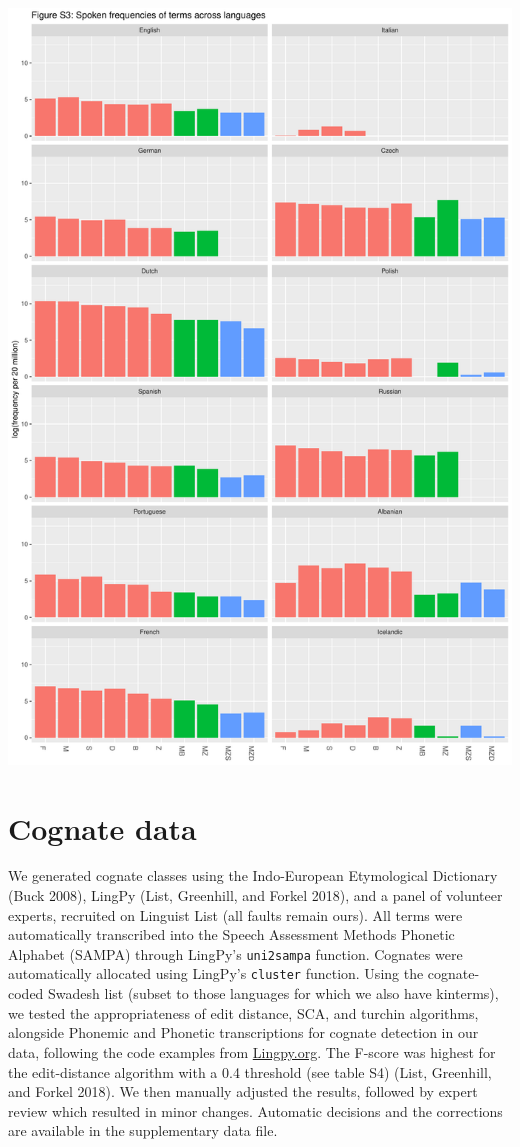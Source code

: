 \documentclass[]{article}
\begin{document}
\begin{center}\includegraphics{figures/unnamed-chunk-6-3} \end{center}

\hypertarget{cognate-data}{%
\section{Cognate data}\label{cognate-data}}

We generated cognate classes using the Indo-European Etymological
Dictionary (Buck 2008), LingPy (List, Greenhill, and Forkel 2018), and a
panel of volunteer experts, recruited on Linguist List (all faults
remain ours). All terms were automatically transcribed into the Speech
Assessment Methods Phonetic Alphabet (SAMPA) through LingPy's
\texttt{uni2sampa} function. Cognates were automatically allocated using
LingPy's \texttt{cluster} function. Using the cognate-coded Swadesh list
(subset to those languages for which we also have kinterms), we tested
the appropriateness of edit distance, SCA, and turchin algorithms,
alongside Phonemic and Phonetic transcriptions for cognate detection in
our data, following the code examples from
\href{http://lingpy.org/examples.html}{Lingpy.org}. The F-score was
highest for the edit-distance algorithm with a 0.4 threshold (see table
S4) (List, Greenhill, and Forkel 2018). We then manually adjusted the
results, followed by expert review which resulted in minor changes.
Automatic decisions and the corrections are available in the
supplementary data file.
\end{document}
